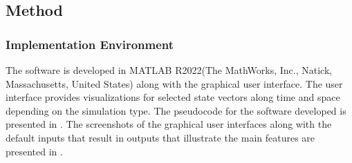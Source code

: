 \documentclass{IEEEtran}
\begin{document}
\subsection{Method}

\subsubsection{Implementation Environment}
The software is developed in MATLAB R2022(The MathWorks, Inc., Natick, Massachusetts, United States) along with the graphical user interface. The user interface provides visualizations for selected state vectors along time and space depending on the simulation type. The pseudocode for the software developed is presented in . The screenshots of the graphical user interfaces along with the default inputs that result in outputs that illustrate the main features are presented in .


\clearpage

\end{document}
